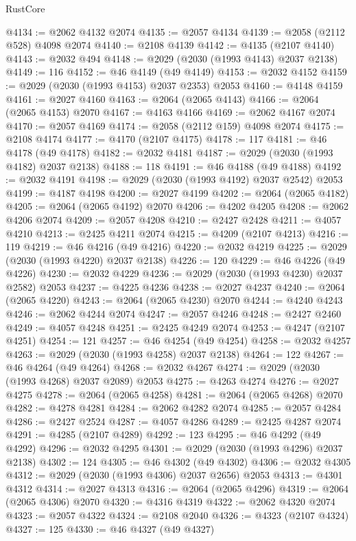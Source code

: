 \begin{lexlean}{RustCore}
\begin{coremodule}
@4134 := @2062 @4132 @2074
@4135 := @2057 @4134
@4139 := @2058 (@2112 @528) @4098 @2074
@4140 := @2108 @4139
@4142 := @4135 (@2107 @4140)
@4143 := @2032 @494
@4148 := @2029 (@2030 (@1993 @4143) @2037 @2138)
@4149 := 116
@4152 := @46 @4149 (@49 @4149)
@4153 := @2032 @4152
@4159 := @2029 (@2030 (@1993 @4153) @2037 @2353) @2053
@4160 := @4148 @4159
@4161 := @2027 @4160
@4163 := @2064 (@2065 @4143)
@4166 := @2064 (@2065 @4153) @2070
@4167 := @4163 @4166
@4169 := @2062 @4167 @2074
@4170 := @2057 @4169
@4174 := @2058 (@2112 @159) @4098 @2074
@4175 := @2108 @4174
@4177 := @4170 (@2107 @4175)
@4178 := 117
@4181 := @46 @4178 (@49 @4178)
@4182 := @2032 @4181
@4187 := @2029 (@2030 (@1993 @4182) @2037 @2138)
@4188 := 118
@4191 := @46 @4188 (@49 @4188)
@4192 := @2032 @4191
@4198 := @2029 (@2030 (@1993 @4192) @2037 @2542) @2053
@4199 := @4187 @4198
@4200 := @2027 @4199
@4202 := @2064 (@2065 @4182)
@4205 := @2064 (@2065 @4192) @2070
@4206 := @4202 @4205
@4208 := @2062 @4206 @2074
@4209 := @2057 @4208
@4210 := @2427 @2428
@4211 := @4057 @4210
@4213 := @2425 @4211 @2074
@4215 := @4209 (@2107 @4213)
@4216 := 119
@4219 := @46 @4216 (@49 @4216)
@4220 := @2032 @4219
@4225 := @2029 (@2030 (@1993 @4220) @2037 @2138)
@4226 := 120
@4229 := @46 @4226 (@49 @4226)
@4230 := @2032 @4229
@4236 := @2029 (@2030 (@1993 @4230) @2037 @2582) @2053
@4237 := @4225 @4236
@4238 := @2027 @4237
@4240 := @2064 (@2065 @4220)
@4243 := @2064 (@2065 @4230) @2070
@4244 := @4240 @4243
@4246 := @2062 @4244 @2074
@4247 := @2057 @4246
@4248 := @2427 @2460
@4249 := @4057 @4248
@4251 := @2425 @4249 @2074
@4253 := @4247 (@2107 @4251)
@4254 := 121
@4257 := @46 @4254 (@49 @4254)
@4258 := @2032 @4257
@4263 := @2029 (@2030 (@1993 @4258) @2037 @2138)
@4264 := 122
@4267 := @46 @4264 (@49 @4264)
@4268 := @2032 @4267
@4274 := @2029 (@2030 (@1993 @4268) @2037 @2089) @2053
@4275 := @4263 @4274
@4276 := @2027 @4275
@4278 := @2064 (@2065 @4258)
@4281 := @2064 (@2065 @4268) @2070
@4282 := @4278 @4281
@4284 := @2062 @4282 @2074
@4285 := @2057 @4284
@4286 := @2427 @2524
@4287 := @4057 @4286
@4289 := @2425 @4287 @2074
@4291 := @4285 (@2107 @4289)
@4292 := 123
@4295 := @46 @4292 (@49 @4292)
@4296 := @2032 @4295
@4301 := @2029 (@2030 (@1993 @4296) @2037 @2138)
@4302 := 124
@4305 := @46 @4302 (@49 @4302)
@4306 := @2032 @4305
@4312 := @2029 (@2030 (@1993 @4306) @2037 @2656) @2053
@4313 := @4301 @4312
@4314 := @2027 @4313
@4316 := @2064 (@2065 @4296)
@4319 := @2064 (@2065 @4306) @2070
@4320 := @4316 @4319
@4322 := @2062 @4320 @2074
@4323 := @2057 @4322
@4324 := @2108 @2040
@4326 := @4323 (@2107 @4324)
@4327 := 125
@4330 := @46 @4327 (@49 @4327)

\end{coremodule}
\end{lexlean}
